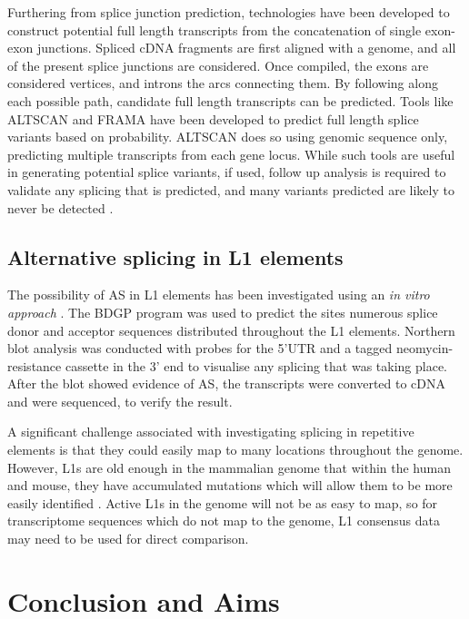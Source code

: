 \documentclass[12pt]{article}
\begin{document}
			Furthering from splice junction prediction, technologies have been developed to construct potential full length transcripts from the concatenation of single exon-exon junctions. Spliced cDNA fragments are first aligned with a genome, and all of the present splice junctions are considered. Once compiled, the exons are considered vertices, and introns the arcs connecting them. By following along each possible path, candidate full length transcripts can be predicted. Tools like ALTSCAN \citep{Hu15} and FRAMA \citep{Bens16} have been developed to predict full length splice variants based on probability. ALTSCAN does so using genomic sequence only, predicting multiple transcripts from each gene locus. 
			While such tools are useful in generating potential splice variants, if used, follow up analysis is required to validate any splicing that is predicted, and many variants predicted are likely to never be detected \citep{Florea06, Hu15}. 
				
		\subsection{Alternative splicing in L1 elements}
	
			The possibility of AS in L1 elements has been investigated using an \textit{in vitro approach} \citep{Belancio06}. The BDGP program \citep{Reese97} was used to predict the sites numerous splice donor and acceptor sequences distributed throughout the L1 elements. 
			Northern blot analysis was conducted with probes for the 5'UTR and a tagged neomycin-resistance cassette in the 3' end to visualise any splicing that was taking place. After the blot showed evidence of AS, the transcripts were converted to cDNA and were sequenced, to verify the result. 

			A significant challenge associated with investigating splicing in repetitive elements is that they  could easily map to many locations throughout the genome. However, L1s are old enough in the mammalian genome that within the human and mouse, they have accumulated mutations which will allow them to be more easily identified \citep{Brouha03,Goodier13}. Active L1s in the genome will not be as easy to map, so for transcriptome sequences which do not map to the genome, L1 consensus data may need to be used for direct comparison.
	
	\section{Conclusion and Aims}
	
\end{document}
